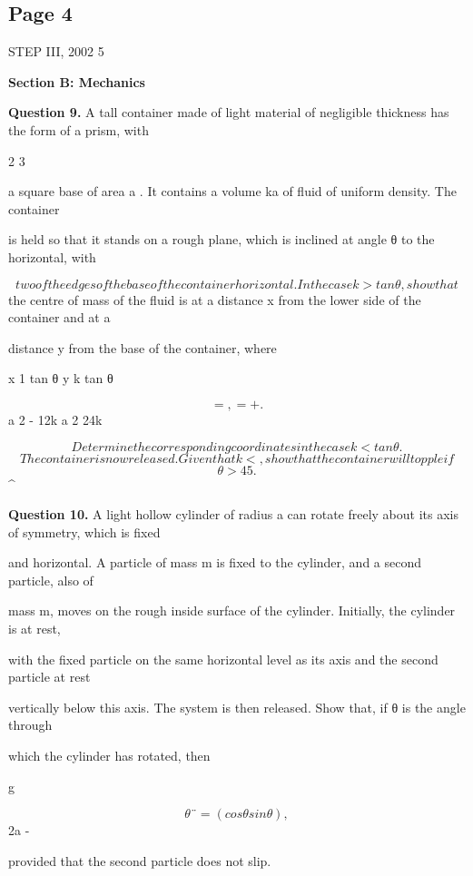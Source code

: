 \documentclass[12pt]{article}
\begin{document}
\subsection*{Page 4}
\begin{flushleft}
STEP III, 2002 5\par
\bigskip\textbf{Section B: Mechanics}\par
\bigskip\textbf{Question 9.} A tall container made of light material of negligible thickness has the form of a prism, with\par
2 3\par
a square base of area a . It contains a volume ka of fluid of uniform density. The container\par
is held so that it stands on a rough plane, which is inclined at angle θ to the horizontal, with\par
\[two of the edges of the base of the container horizontal. In the case k > tan θ, show that\]
the centre of mass of the fluid is at a distance x from the lower side of the container and at a\par
distance y from the base of the container, where\par
x 1 tan θ y k tan θ\par
\[= , = + .\]
a 2 - 12k a 2 24k\par
\[Determine the corresponding coordinates in the case k < tan θ.\]
\[The container is now released. Given that k < , show that the container will topple if\]
\[θ > 45 .\]
\textasciicircum{}\circ\par
\bigskip\textbf{Question 10.} A light hollow cylinder of radius a can rotate freely about its axis of symmetry, which is fixed\par
and horizontal. A particle of mass m is fixed to the cylinder, and a second particle, also of\par
mass m, moves on the rough inside surface of the cylinder. Initially, the cylinder is at rest,\par
with the fixed particle on the same horizontal level as its axis and the second particle at rest\par
vertically below this axis. The system is then released. Show that, if θ is the angle through\par
which the cylinder has rotated, then\par
g\par
\[θ¨ = (cos θ sin θ) ,\]
2a -\par
provided that the second particle does not slip.\par

\end{flushleft}
\end{document}
